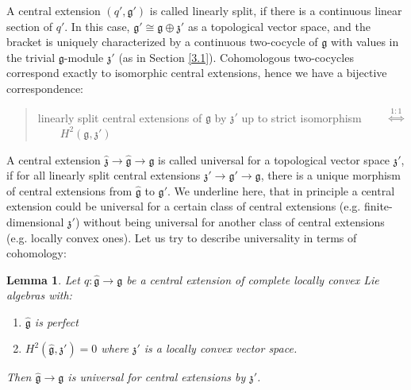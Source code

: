 \documentclass{article}
\newcommand{\fg}{\mathfrak{g}}
\newtheorem{Lemma}[Theorem]{Lemma}
\theoremstyle{definition}
\begin{document}
A central extension $(q',\mathfrak g')$  is called linearly split, if there is a continuous linear section of $q'$. In this case, $\mathfrak g'\cong \mathfrak g\oplus \mathfrak z'$ as a topological vector space, and the bracket is uniquely characterized by a continuous two-cocycle of $\mathfrak g$ with values in 
the trivial $\fg$-module $\mathfrak z'$ (as in Section \ref{3.1}).
Cohomologous two-cocycles correspond exactly to isomorphic central extensions, hence we have a bijective correspondence:

\begin{quote}
linearly split central extensions of $\mathfrak g$ by $\mathfrak z'$ up to strict isomorphism ~~~~$\overset{1:1}{\Longleftrightarrow}$ ~~~~$H^2(\mathfrak g,\mathfrak z')$
\end{quote}


A central extension $\hat{\mathfrak z}\to \hat{\mathfrak g}\to \mathfrak g$ is called universal for a topological vector space $\mathfrak z'$, if for all linearly split central extensions $\mathfrak z'\to \mathfrak g'\to\mathfrak g$, there is a unique morphism of central extensions from $\hat{\mathfrak g}$ to $\mathfrak g'$. We underline here, that in principle a central extension could be universal for a certain class of central extensions (e.g. finite-dimensional $\mathfrak z'$) without being universal for another class of central extensions (e.g. locally convex ones). Let us try to describe universality in terms of cohomology:

\begin{Lemma}\label{lem:closedimpliesuniversal} Let $\hat q: \hat{\mathfrak g}\to \mathfrak g$ be a central extension of complete locally convex Lie algebras with:
	\begin{enumerate}
		\item $\hat{\mathfrak g}$ is perfect
		\item $H^2(\hat{\mathfrak g},\mathfrak z')=0$ where $\mathfrak z'$ is a locally convex vector space.
	\end{enumerate}
	Then $\hat{\mathfrak g}\to \mathfrak g$ is universal for central extensions by $\mathfrak z'$.
\end{Lemma}
\end{document}
